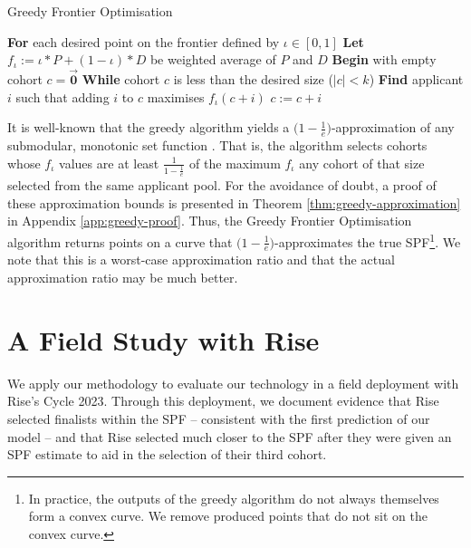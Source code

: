 \begin{algorithm}
    \caption{Greedy Frontier Optimisation}\label{alg:frontier}
    \begin{algorithmic}
    \State \textbf{For} each desired point on the frontier defined by $\iota \in [0, 1]$
    \State \hspace{\algorithmicindent} \textbf{Let} $f_{\iota} := \iota*P+(1-\iota)*D$ be weighted average of $P$ and $D$
    \State \hspace{\algorithmicindent} \textbf{Begin} with empty cohort $c = \vec{\mathbf{0}}$
    \State \hspace{\algorithmicindent} \textbf{While} cohort $c$ is less than the desired size ($|c| < k$)
    \State \hspace{\algorithmicindent} \hspace{\algorithmicindent} \textbf{Find} applicant $i$ such that adding $i$ to $c$ maximises $f_{\iota}(c + i)$
    \State \hspace{\algorithmicindent} \hspace{\algorithmicindent} $c := c + i$
    \end{algorithmic}
\end{algorithm}

It is well-known that the greedy algorithm yields a $\bigl( 1-\frac{1}{e} \bigr)$-approximation of any submodular, monotonic set function \cite{bordeaux_submodular_2014}. That is, the algorithm selects cohorts whose $f_\iota$ values are at least $\frac{1}{1-\frac{1}{e}}$ of the maximum $f_\iota$ any cohort of that size selected from the same applicant pool. For the avoidance of doubt, a proof of these approximation bounds is presented in Theorem \ref{thm:greedy-approximation} in Appendix \ref{app:greedy-proof}. Thus, the Greedy Frontier Optimisation algorithm returns points on a curve that $\bigl( 1-\frac{1}{e} \bigr)$-approximates the true SPF\footnote{In practice, the outputs of the greedy algorithm do not always themselves form a convex curve. We remove produced points that do not sit on the convex curve.}. We note that this is a worst-case approximation ratio and that the actual approximation ratio may be much better.

\section{A Field Study with Rise}\label{sec:spfresults}

We apply our methodology to evaluate our technology in a field deployment with Rise's Cycle 2023. Through this deployment, we document evidence that Rise selected finalists within the SPF -- consistent with the first prediction of our model -- and that Rise selected much closer to the SPF after they were given an SPF estimate to aid in the selection of their third cohort.

